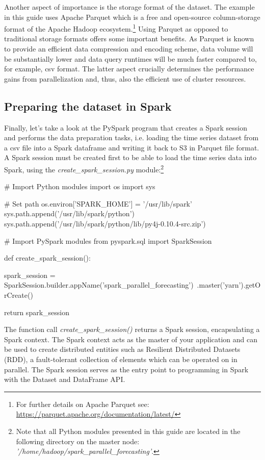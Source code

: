\documentclass[11pt]{article}
\begin{document}
Another aspect of importance is the storage format of the dataset. The example in this guide uses Apache Parquet which is a free and open-source column-storage format of the Apache Hadoop ecosystem.\footnote{For further details on Apache Parquet see: \url{https://parquet.apache.org/documentation/latest/}} Using Parquet as opposed to traditional storage formats offers some important benefits. As Parquet is known to provide an efficient data compression and encoding scheme, data volume will be substantially lower and data query runtimes will be much faster compared to, for example, csv format. The latter aspect crucially determines the performance gains from parallelization and, thus, also the efficient use of cluster resources.   

\subsection{Preparing the dataset in Spark}
\label{sec:dataset_preparation}

Finally, let's take a look at the PySpark program that creates a Spark session and performs the data preparation tasks, i.e. loading the time series dataset from a csv file into a Spark dataframe and writing it back to S3 in Parquet file format. A Spark session must be created first to be able to load the time series data into Spark, using the \emph{create\_spark\_session.py} module:\footnote{Note that all Python modules presented in this guide are located in the following directory on the master node: \emph{'/home/hadoop/spark\_parallel\_forecasting'}.} 

\begin{python}[caption={\emph{create\_spark\_session.py}}]
# Import Python modules
import os
import sys

# Set path
os.environ['SPARK_HOME'] = '/usr/lib/spark'
sys.path.append('/usr/lib/spark/python')
sys.path.append('/usr/lib/spark/python/lib/py4j-0.10.4-src.zip')

# Import PySpark modules
from pyspark.sql import SparkSession

def create_spark_session():

    spark_session = SparkSession.builder.appName('spark_parallel_forecasting')\
        .master('yarn').getOrCreate()

    return spark_session
\end{python}

The function call \emph{create\_spark\_session()} returns a Spark session, encapsulating a Spark context. The Spark context acts as the master of your application and can be used to create distributed entities such as Resilient Distributed Datasets (RDD), a fault-tolerant collection of elements which can be operated on in parallel. The Spark session serves as the entry point to programming in Spark with the Dataset and DataFrame API. 
\end{document}
